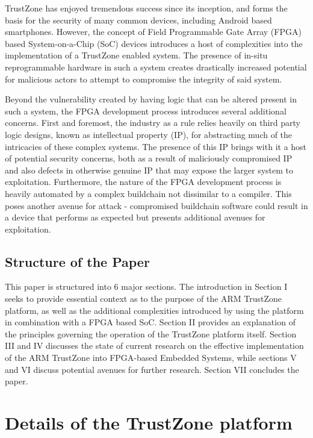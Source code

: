 \documentclass[journal]{IEEEtran}
\begin{document}
TrustZone has enjoyed tremendous success since its inception, and forms the basis for the
security of many common devices, including Android based smartphones. However, the concept
of Field Programmable Gate Array (FPGA) based System-on-a-Chip (SoC) devices introduces a
host of complexities into the implementation of a TrustZone enabled system. The
presence of in-situ reprogrammable hardware in such a system creates drastically increased
potential for malicious actors to attempt to compromise the integrity of said system.

Beyond the vulnerability created by having logic that can be altered present in such a
system, the FPGA development process introduces several additional concerns. First and
foremost, the industry as a rule relies heavily on third party logic designs, known as 
intellectual property (IP), for abstracting much of the intricacies of these complex 
systems. The presence of this IP brings with it a host of potential security concerns,
both as a result of maliciously compromised IP and also defects in otherwise genuine IP 
that may expose the larger system to exploitation. Furthermore, the nature of the FPGA
development process is heavily automated by a complex buildchain not dissimilar to a
compiler. This poses another avenue for attack - compromised buildchain software could
result in a device that performs as expected but presents additional avenues for
exploitation.

\subsection{Structure of the Paper}
This paper is structured into 6 major sections. The introduction in Section I seeks to
provide essential context as to the purpose of the ARM TrustZone platform, as well as the 
additional complexities introduced by using the platform in combination with a FPGA based 
SoC. Section II provides an explanation of the principles governing the operation of the 
TrustZone platform itself. Section III and IV discusses the state of current research on
the effective implementation of the ARM TrustZone into FPGA-based Embedded Systems, while 
sections V and VI discuss potential avenues for further research. Section VII concludes 
the paper.

\section{Details of the TrustZone platform}
\end{document}
